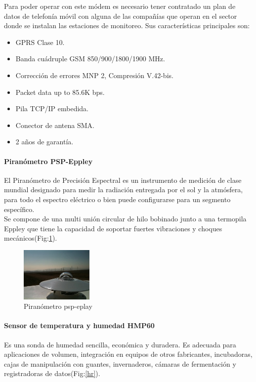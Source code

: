 Para poder operar con este módem es necesario tener contratado un plan de datos de telefonía móvil con alguna de las compañías que operan en el sector donde se instalan las estaciones de monitoreo. Sus características principales son:\\

\begin{itemize}
\item GPRS Clase 10.
\item Banda cuádruple GSM 850/900/1800/1900 MHz.
\item Corrección de errores MNP 2, Compresión V.42-bis.
\item Packet data up to 85.6K bps.
\item Pila TCP/IP embedida.
\item Conector de antena SMA.
\item 2 años de garantía.
\end{itemize}

\paragraph{Piranómetro PSP-Eppley}
El Piranómetro de Precisión Espectral es un instrumento de medición de clase mundial designado para medir la radiación entregada por el sol y la atmósfera, para todo el espectro eléctrico o bien puede configurarse para un segmento específico.\\
Se compone de una multi unión circular de hilo bobinado junto a una termopila Eppley que tiene la capacidad de soportar fuertes vibraciones y choques mecánicos(Fig:\ref{piranometro}).

\begin{figure}[h!]
        \centering
        \includegraphics[width=100pt]{images/piranometro}
        \caption{Piranómetro psp-eplay}
	\label{piranometro}
\end{figure}

\paragraph{Sensor de temperatura y humedad HMP60}
Es una sonda de humedad sencilla, económica y duradera. Es adecuada para aplicaciones de volumen, integración en equipos de otros fabricantes, incubadoras, cajas de manipulación con guantes, invernaderos, cámaras de fermentación y registradoras de datos(Fig:\ref{hr}).

